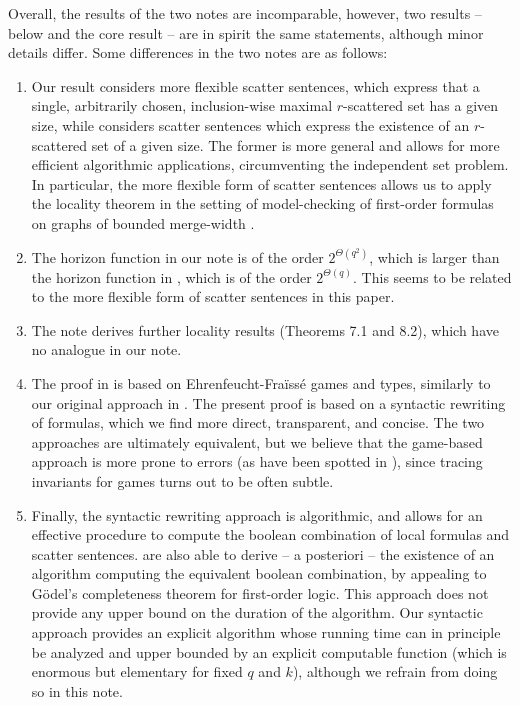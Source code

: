 \documentclass[11pt]{article}
\theoremstyle{remark}
\begin{document}
Overall, the results of the two notes are incomparable, however, two results --
 below and the core result \cite[Theorem 6.3]{grohe2026rankpreservinggaifmannormalform} -- are in spirit the same statements, although minor details differ. 
Some differences in the two notes are as follows:
\begin{enumerate}
    \item Our result considers more flexible scatter sentences, which express that a single, arbitrarily chosen, inclusion-wise maximal $r$-scattered set has a given size, while \cite{grohe2026rankpreservinggaifmannormalform} considers scatter sentences which express the existence of an $r$-scattered set of a given size. The former is more general and allows for more efficient algorithmic applications, circumventing the independent set problem. In particular, the more flexible form of scatter sentences allows us to apply the locality theorem in the setting of model-checking of first-order formulas on graphs of bounded merge-width \cite{mw-arxiv-v1,mw-stoc}.
    \item The horizon function in our note is of the order $2^{\Theta(q^2)}$, which is larger than the horizon function in \cite{grohe2026rankpreservinggaifmannormalform}, which is of the order $2^{\Theta(q)}$. 
    This seems to be related to the more 
flexible form of scatter sentences in this paper.

    \item The note \cite{grohe2026rankpreservinggaifmannormalform} derives further locality results (Theorems 7.1 and  8.2), which have no analogue in our note.
    \item The proof in \cite{grohe2026rankpreservinggaifmannormalform} is based on Ehrenfeucht-Fra\"iss\'e games and types, similarly to our original approach in \cite{mw-arxiv-v1}. The present proof is based on a syntactic rewriting of formulas, which we find more direct, transparent, and concise. The two approaches are ultimately equivalent, but 
    we believe that the game-based approach is more prone to errors (as have been spotted in \cite{mw-arxiv-v1,gs-pods}), since tracing invariants for games turns out to be often subtle.

\item Finally, the syntactic rewriting approach is algorithmic, and allows for an effective procedure to compute the boolean combination of local formulas and scatter sentences. 
    \cite{grohe2026rankpreservinggaifmannormalform} are also able to derive -- a posteriori -- the existence of an algorithm computing the equivalent boolean combination, by appealing to G\"odel's completeness theorem for first-order logic. This approach does not provide any upper bound on the duration of the algorithm. Our syntactic approach provides an explicit algorithm whose running time can in principle be analyzed and upper bounded by an explicit computable function (which is enormous but elementary for fixed $q$ and $k$), although we refrain from doing so in this note.
\end{enumerate}
\end{document}
